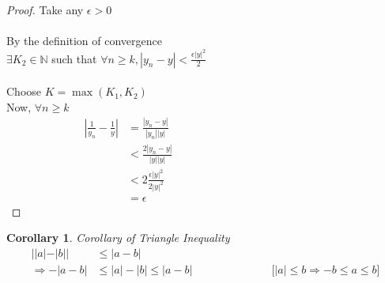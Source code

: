 \documentclass{article}
\newtheorem{corollary}{Corollary}[section]
\newcommand{\Rw}{\Rightarrow}
\newcommand{\hs}{\hspace}
\newcommand{\ds}{\displaystyle}
\begin{document}
\begin{theorem}{}{}
\begin{proof}
    Take any $\epsilon >0$\\\\ By the definition of convergence\\
    $\exists K_2 \in \mathbb{N}$\; such that $\forall n \geq k, |y_n-y|<\ds\frac{\epsilon |y|^2}{2}$\\\\
    Choose $K=\max(K_1,K_2)$\\Now, $\forall n\geq k$\\
    \begin{align*}
        |\frac{1}{y_n}-\frac{1}{y}| & =\frac{|y_n-y|}{|y_n||y|}     \hs{6cm} \\
                                    & <\frac{2|y_n-y|}{|y||y|}               \\
                                    & <2 \frac{\epsilon |y|^2}{2|y|^2}       \\
                                    & =\epsilon
    \end{align*}
\end{proof}
\end{theorem}
\begin{corollary}\label{TE}
    Corollary of Triangle Inequality\\
    \begin{align*}
        ||a|-|b||  & \leq |a-b|\\
        \Rw -|a-b| & \leq |a|-|b|\leq |a-b| \hs{3cm}  \text{[$|a|\leq b \Rw -b\leq a \leq b$]} \\
    \end{align*}
\end{corollary}
\end{document}
